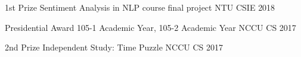 
\begin{cvhonors}

  \cvhonor
    {1st Prize} %
    {Sentiment Analysis in NLP course final project} %
    {NTU CSIE} %
    {2018} %

  \cvhonor
    {Presidential Award} %
    {105-1 Academic Year, 105-2 Academic Year} %
    {NCCU CS} %
    {2017} %

  \cvhonor
    {2nd Prize} %
    {Independent Study: Time Puzzle} %
    {NCCU CS} %
    {2017} %

\end{cvhonors}
